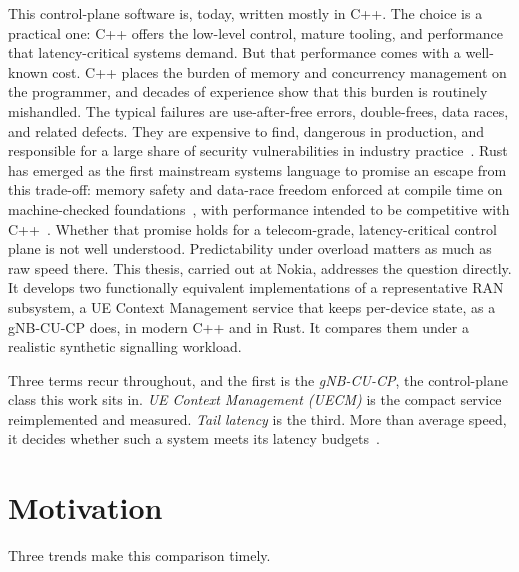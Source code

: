 \documentclass[english,oneside,a4paper,censored,csm,software-track-2020]{HYthesisML}
\begin{document}
This control-plane software is, today, written mostly in C++. The choice is a
practical one: C++ offers the low-level control, mature tooling, and performance that
latency-critical systems demand. But that performance comes with a well-known cost. C++
places the burden of memory and concurrency management on the programmer, and decades of
experience show that this burden is routinely mishandled. The typical failures are
use-after-free errors, double-frees, data races, and related defects. They are expensive
to find, dangerous in production, and responsible for a large share of security
vulnerabilities in industry practice~\cite{msrc2019memory,google2022android}. Rust has
emerged as the first mainstream systems language to promise an escape from this
trade-off: memory safety and data-race freedom enforced at compile time on
machine-checked foundations~\cite{klabnik2023rust,jung2018rustbelt}, with performance
intended to be competitive with C++~\cite{balasubramanian2017rust}. Whether that promise
holds for a telecom-grade, latency-critical control plane is not well understood.
Predictability under overload matters as much as raw speed there. This thesis, carried
out at Nokia, addresses the question directly. It develops two functionally equivalent
implementations of a representative RAN subsystem, a UE Context Management service that
keeps per-device state, as a gNB-CU-CP does, in modern C++ and in Rust. It compares them
under a realistic synthetic signalling workload.


Three terms recur throughout, and the first is the \emph{gNB-CU-CP}, the control-plane class this work sits in.
\emph{UE Context Management (UECM)} is the compact service reimplemented and measured.
\emph{Tail latency} is the third. More than average speed, it decides whether such a system meets its
latency budgets~\cite{dean2013tail,barroso2017microseconds}. 
\section{Motivation}\label{sec:motivation}
Three trends make this comparison timely.
\end{document}
